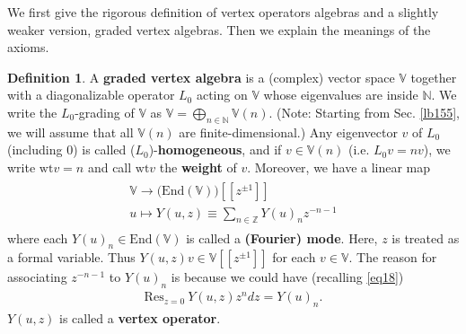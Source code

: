 \documentclass[12pt,a4paper,notitlepage]{article}
\theoremstyle{definition}
\newtheorem{df}{Definition}[section]
\theoremstyle{plain}
\newcommand{\wtd}{\widetilde}
\newcommand{\End}{\mathrm{End}} %
\newcommand{\Res}{\mathrm{Res}}
\newcommand{\Vbb}{\mathbb V}
\newcommand{\Nbb}{\mathbb N}
\newcommand{\Zbb}{\mathbb Z}
\newcommand{\wt}{\mathrm{wt}}
\numberwithin{equation}{section}
\begin{document}
We first give the rigorous definition of vertex operators algebras and a slightly weaker version, graded vertex algebras. Then we explain the meanings of the axioms.



\begin{df}\label{lb24}
A \textbf{graded vertex algebra} is a (complex) vector space $\Vbb$ together with a diagonalizable operator $L_0$ acting on $\Vbb$ whose eigenvalues are inside $\Nbb$. We write the $L_0$-grading of $\Vbb$ as $\Vbb=\bigoplus_{n\in\Nbb}\Vbb(n)$. (Note: Starting from Sec. \ref{lb155}, we will assume that all $\Vbb(n)$ are finite-dimensional.) Any eigenvector $v$ of $L_0$ (including $0$) is called ($L_0$)-\textbf{homogeneous}, and if $v\in \Vbb(n)$ (i.e. $L_0v=nv$), we write $\wt v=n$ \index{vw@$\wt v,\wtd\wt w$} and call $\wt v$ the \textbf{weight} of $v$. Moreover, we have a linear map
\begin{gather}
\begin{gathered}
\Vbb\rightarrow\big(\End(\Vbb)\big)[[z^{\pm1}]]\\
u\mapsto Y(u,z)\equiv\sum_{n\in\Zbb}Y(u)_nz^{-n-1}
\end{gathered}	
\end{gather}
where each $Y(u)_n\in\End(\Vbb)$ is called a \textbf{(Fourier) mode}. Here, $z$ is treated as a formal variable. Thus $Y(u,z)v\in\Vbb[[z^{\pm1}]]$ for each $v\in\Vbb$. The reason for associating $z^{-n-1}$ to $Y(u)_n$ is because we could have (recalling \eqref{eq18})
\begin{align}
\Res_{z=0}~Y(u,z)z^ndz=Y(u)_n.	
\end{align}
$Y(u,z)$ is called a \textbf{vertex operator}. 


\end{df}
\end{document}
